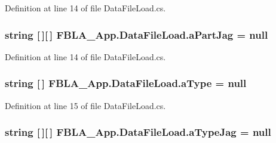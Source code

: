 Definition at line 14 of file Data\+File\+Load.\+cs.

\hypertarget{class_f_b_l_a___app_1_1_data_file_load_acff62a9bb86677318fca538da11a6296}{
\subsubsection[{a\+Part\+Jag}]{\setlength{\rightskip}{0pt plus 5cm}string \mbox{[}$\,$\mbox{]}\mbox{[}$\,$\mbox{]} F\+B\+L\+A\+\_\+\+App.\+Data\+File\+Load.\+a\+Part\+Jag = null}}\label{class_f_b_l_a___app_1_1_data_file_load_acff62a9bb86677318fca538da11a6296}


Definition at line 14 of file Data\+File\+Load.\+cs.

\hypertarget{class_f_b_l_a___app_1_1_data_file_load_a99d8bc15c2fb77c802b81c74067c9c59}{
\subsubsection[{a\+Type}]{\setlength{\rightskip}{0pt plus 5cm}string \mbox{[}$\,$\mbox{]} F\+B\+L\+A\+\_\+\+App.\+Data\+File\+Load.\+a\+Type = null}}\label{class_f_b_l_a___app_1_1_data_file_load_a99d8bc15c2fb77c802b81c74067c9c59}


Definition at line 15 of file Data\+File\+Load.\+cs.

\hypertarget{class_f_b_l_a___app_1_1_data_file_load_a8375bab9dfdbc7f61c60d2a09346c297}{
\subsubsection[{a\+Type\+Jag}]{\setlength{\rightskip}{0pt plus 5cm}string \mbox{[}$\,$\mbox{]}\mbox{[}$\,$\mbox{]} F\+B\+L\+A\+\_\+\+App.\+Data\+File\+Load.\+a\+Type\+Jag = null}}\label{class_f_b_l_a___app_1_1_data_file_load_a8375bab9dfdbc7f61c60d2a09346c297}



